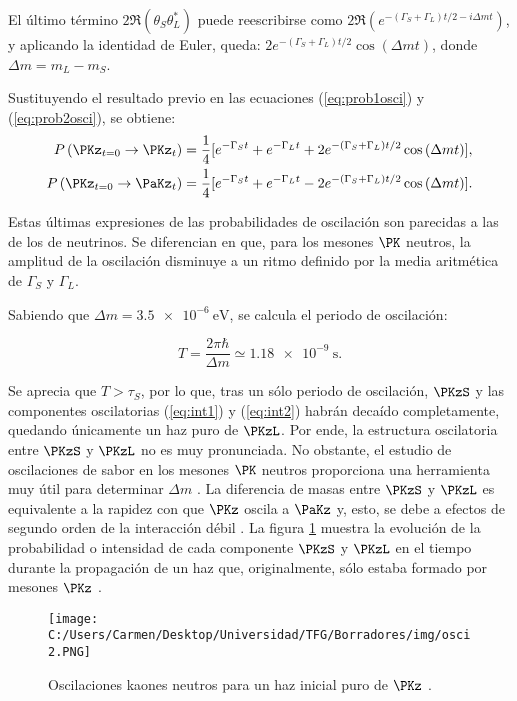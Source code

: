 El último término $2\Re\left(\theta_{S}\theta_{L}^{\ast}\right)$ puede reescribirse como $2\Re\left(e^{-\left(\Gamma_{S}+\Gamma_{L}\right)t/2-i\Delta mt}\right)$, y aplicando la identidad de Euler, queda: $2e^{-\left(\Gamma_{S}+\Gamma_{L}\right)t/2} \cos \left(\Delta mt\right)$, donde $\Delta m = m_{L}-m_{S}$.

Sustituyendo el resultado previo en las ecuaciones (\ref{eq:prob1osci}) y (\ref{eq:prob2osci}), se obtiene:
\begin{align}
P\left(\PKz_{t=0} \rightarrow \PKz_{t}\right) &= \dfrac{1}{4}[e^{-\Gamma_{S}t}+e^{-\Gamma_{L}t}+ 2e^{-\left(\Gamma_{S}+\Gamma_{L}\right)t/2} \cos \left(\Delta mt\right)],\label{eq:int1} \\
P\left(\PKz_{t=0} \rightarrow \PaKz_{t}\right) &= \dfrac{1}{4}[e^{-\Gamma_{S}t}+e^{-\Gamma_{L}t}-2e^{-\left(\Gamma_{S}+\Gamma_{L}\right)t/2} \cos \left(\Delta mt\right)].\label{eq:int2}
\end{align}

Estas últimas expresiones de las probabilidades de oscilación son parecidas a las de los de neutrinos. Se diferencian en que, para los mesones $\PK$ neutros, la amplitud de la oscilación disminuye a un ritmo definido por la media aritmética de $\Gamma_{S}$ y $\Gamma_{L}$.

Sabiendo que $\Delta m = \SI{3,5e-6}{\eV}$, se calcula el periodo de oscilación:

\begin{equation}
T=\dfrac{2\pi\hbar}{\Delta m} \simeq \SI{1.18e-9}{\second}.
\end{equation}

Se aprecia que $T>\tau_{S}$, por lo que, tras un sólo periodo de oscilación, $\PKzS$ y las componentes oscilatorias (\ref{eq:int1}) y (\ref{eq:int2}) habrán decaído completamente, quedando únicamente un haz puro de $\PKzL$. Por ende, la estructura oscilatoria entre $\PKzS$ y $\PKzL$ no es muy pronunciada.  No obstante, el estudio de oscilaciones de sabor en los mesones $\PK$ neutros proporciona una herramienta muy útil para determinar $\Delta m$ \cite{Thomson}. La diferencia de masas entre $\PKzS$ y $\PKzL$ es equivalente a la rapidez con que $\PKz$ oscila a $\PaKz$ y, esto, se debe a efectos de segundo orden de la interacción débil \cite{Perkins}. La figura \ref{fig:oscillation2} muestra la evolución de la probabilidad o intensidad de cada componente $\PKzS$ y $\PKzL$ en el tiempo durante la propagación de un haz que, originalmente, sólo estaba formado por mesones $\PKz$ \cite{Thomson}. 

\begin{figure}[!ht]
	\centering
	\texttt{[image: C:/Users/Carmen/Desktop/Universidad/TFG/Borradores/img/osci2.PNG]}
	\caption[Efecto de las oscilaciones de sabor en mesones $\PK$ neutros.]
	{Oscilaciones kaones neutros para un haz inicial puro de $\PKz$ \cite{Thomson}.}
	\label{fig:oscillation2}
\end{figure}